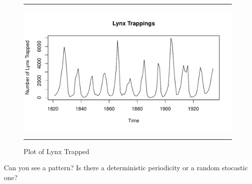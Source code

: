 \documentclass[11pt, letterpaper, twoside]{memoir}\usepackage{knitr}
\begin{document}
\begin{figure}
\centering
\rule{4in}{1pt}
\begin{knitrout}
\color{fgcolor}\begin{kframe}
\begin{alltt}
\hlstd{(}\hlstd{)} 
 \hlstd{=}\hlstd{,} \hlstd{=}\hlstd{)}
\end{alltt}
\end{kframe}
\includegraphics[width=\maxwidth]{figure/unnamed-chunk-103-1} 

\end{knitrout}
\caption{Plot of Lynx Trapped}
\label{Fig:lynx}
\rule{4in}{1pt}
\end{figure}

Can you see a pattern? Is there a deterministic periodicity or a random stocastic one?
\end{document}
